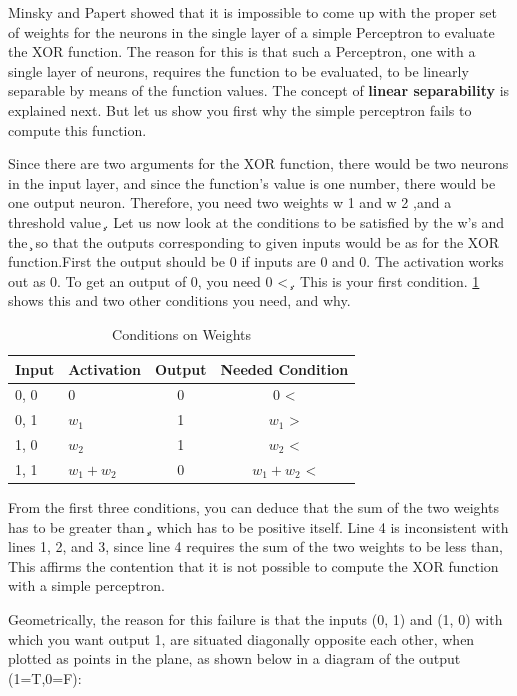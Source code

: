 \documentclass[12pt, right open]{memoir}
\begin{document}
Minsky and Papert showed that it is impossible to come up with the proper set of weights for the neurons in the single layer of a simple Perceptron to evaluate the XOR function. The reason for this is that such a Perceptron, one with a single layer of neurons, requires the function to be evaluated, to be linearly separable by means of the function values. The concept of \textbf{linear separability} is explained next. But let us show you first why the simple perceptron fails to compute this function.

Since there are two arguments for the XOR function, there would be two
neurons in the input layer, and since the function’s value is one number, there would be one output neuron. Therefore, you need two weights w 1 and w 2 ,and a threshold value  ̧. Let us now look at the conditions to be satisfied by the w’s and the  ̧ so that the outputs corresponding to given inputs would be as for the XOR function.First the output should be 0 if inputs are 0 and 0. The activation works out as 0. To get an output of 0, you need 0 <  ̧. This is your first condition. \ref{tab:conditions_on_weights} shows this and two other conditions you need, and why.

\begin{table} 
\caption{Conditions on Weights}
\label{tab:conditions_on_weights}
\begin{tabular}{|l|l|c|c|}
\hline
Input & Activation & Output & Needed Condition  \\
\hline
0, 0  & 0          & 0      & 0 <               \\ 
\hline
0, 1  & $w_1$      & 1      & $w_1$ >           \\ 
\hline
1, 0  & $w_2$      & 1      & $w_2$ <            \\ 
\hline
1, 1  & $w_1 + w_2$ & 0      & $w_1 + w_2$ <       \\ 
\hline
\end{tabular}
\end{table}

From the first three conditions, you can deduce that the sum of the two weights has to be greater than  ̧, which has to be positive itself. Line 4 is inconsistent with lines 1, 2, and 3, since line 4 requires the sum of the two weights to be less than, This affirms the contention that it is not possible to compute the XOR function with a simple perceptron.

Geometrically, the reason for this failure is that the inputs (0, 1) and (1, 0) with which you want output 1, are situated diagonally opposite each other, when plotted as points in the plane, as shown below in a diagram of the output (1=T,0=F): \\
\end{document}

